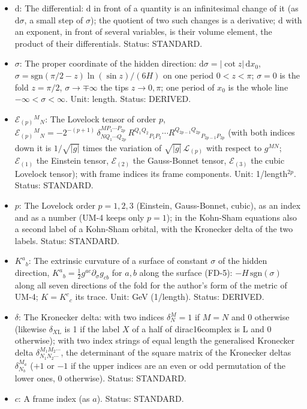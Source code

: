 \documentclass[
  10pt,
]{article}
\begin{document}
\begin{itemize}
\item
  \(\mathrm{d}\): The differential: \(\mathrm{d}\) in front of a
  quantity is an infinitesimal change of it (as \(\mathrm{d}\sigma\), a
  small step of \(\sigma\)); the quotient of two such changes is a
  derivative; \(\mathrm{d}\) with an exponent, in front of several
  variables, is their volume element, the product of their
  differentials. Status: STANDARD.
\item
  \(\sigma\): The proper coordinate of the hidden direction:
  \(\mathrm{d}\sigma = \lvert\cot z\rvert\,\mathrm{d}x_0\),
  \(\sigma = \mathrm{sgn}(\pi/2 - z)\ln(\sin z)/(6H)\) on one period
  \(0 < z < \pi\); \(\sigma = 0\) is the fold \(z = \pi/2\),
  \(\sigma \to \mp\infty\) the tips \(z \to 0, \pi\); one period of
  \(x_0\) is the whole line \(-\infty < \sigma < \infty\). Unit: length.
  Status: DERIVED.
\item
  \(\mathcal{E}_{(p)}{}^M{}_N\): The Lovelock tensor of order \(p\),
  \(\mathcal{E}_{(p)}{}^M{}_N = -2^{-(p+1)}\,\delta^{MP_1\cdots P_{2p}}_{NQ_1\cdots Q_{2p}}\,R^{Q_1Q_2}{}_{P_1P_2}\cdots R^{Q_{2p-1}Q_{2p}}{}_{P_{2p-1}P_{2p}}\)
  (with both indices down it is \(1/\sqrt{\lvert g\rvert}\) times the
  variation of \(\sqrt{\lvert g\rvert}\,\mathcal{L}_{(p)}\) with respect
  to \(g^{MN}\); \(\mathcal{E}_{(1)}\) the Einstein tensor,
  \(\mathcal{E}_{(2)}\) the Gauss-Bonnet tensor, \(\mathcal{E}_{(3)}\)
  the cubic Lovelock tensor); with frame indices its frame components.
  Unit: 1/length\(^{2p}\). Status: STANDARD.
\item
  \(p\): The Lovelock order \(p = 1, 2, 3\) (Einstein, Gauss-Bonnet,
  cubic), as an index and as a number (UM-4 keeps only \(p = 1\)); in
  the Kohn-Sham equations also a second label of a Kohn-Sham orbital,
  with the Kronecker delta of the two labels. Status: STANDARD.
\item
  \(K^a{}_b\): The extrinsic curvature of a surface of constant
  \(\sigma\) of the hidden direction,
  \(K^a{}_b = \frac12 g^{ac}\partial_\sigma g_{cb}\) for \(a, b\) along
  the surface (FD-5): \(-H\,\mathrm{sgn}(\sigma)\) along all seven
  directions of the fold for the author's form of the metric of UM-4;
  \(K = K^c{}_c\) its trace. Unit: GeV (1/length). Status: DERIVED.
\item
  \(\delta\): The Kronecker delta: with two indices \(\delta^M_N = 1\)
  if \(M = N\) and 0 otherwise (likewise \(\delta_{X\mathrm{L}}\) is 1
  if the label \(X\) of a half of dirac16complex is L and 0 otherwise);
  with two index strings of equal length the generalised Kronecker delta
  \(\delta^{M_1M_2\cdots}_{N_1N_2\cdots}\), the determinant of the
  square matrix of the Kronecker deltas \(\delta^{M_a}_{N_b}\) (\(+1\)
  or \(-1\) if the upper indices are an even or odd permutation of the
  lower ones, 0 otherwise). Status: STANDARD.
\item
  \(c\): A frame index (as \(a\)). Status: STANDARD.
\end{itemize}
\end{document}

